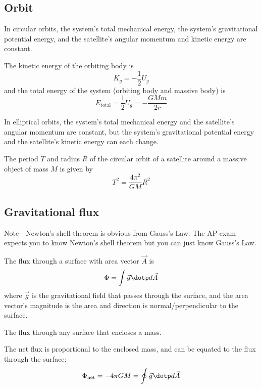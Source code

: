 \subsection{Orbit}

\begin{theorem}
	In circular orbits, the system's total
	mechanical energy, the system's
	gravitational potential energy, and the
	satellite's angular momentum and kinetic
	energy are constant.

	The kinetic energy of the orbiting body is
	\[
		K_g = - \frac{1}{2} U_g
	\]
	and the total energy of the system (orbiting body and massive body) is
	\[
		E_{\text{total}} = \frac{1}{2} U_g = - \frac{GMm}{2r}
	\]
\end{theorem}

\begin{theorem}
	In elliptical orbits, the system's total
	mechanical energy and the satellite's
	angular momentum are constant, but the
	system's gravitational potential energy
	and the satellite's kinetic energy can each
	change.
\end{theorem}

\begin{namedlaw}
	The period $T$ and radius $R$ of the circular orbit of a satellite around a massive object of mass $M$ is given by
	\[
		T^2 = \frac{4 \pi^2}{GM} R^2
	\]
\end{namedlaw}

\subsection{Gravitational flux}

Note - Newton's shell theorem is obvious from Gauss's Law. The AP exam expects you to know Newton's shell theorem but you can just know Gauss's Law.

\begin{definition}
  The flux through a surface with area vector $\vec{A}$ is
  \[
    \Phi = \int \vec{g} \dotp d\vec{A}
  \]
  where $\vec{g}$ is the gravitational field that passes through the surface, and the area vector's magnitude is the area and direction is normal/perpendicular to the surface.
\end{definition}

\begin{definition}
  The flux through any surface that encloses a mass.
\end{definition}

\begin{namedtheorem}
  The net flux is proportional to the enclosed mass, and can be equated to the flux through the surface:
  \[
    \Phi_{\text{net}} = - 4\pi G M = \oint \vec{g} \dotp d\vec{A}
  \]
\end{namedtheorem}

